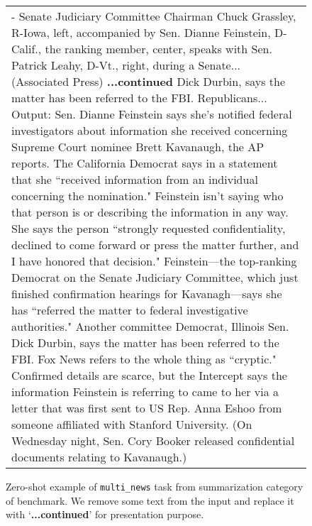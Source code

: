 \begin{figure}[h]
\begin{tabular}{p{}}
\vspace{1pt} \newline \vspace{1pt} \newline \vspace{1pt} \newline -  Senate Judiciary Committee Chairman Chuck Grassley, R-Iowa, left, accompanied by Sen. Dianne Feinstein, D-Calif., the ranking member, center, speaks with Sen. Patrick Leahy, D-Vt., right, during a Senate... (Associated Press) \textbf{...continued}
Dick Durbin, says the matter has been referred to the FBI. \vspace{1pt} \newline  \vspace{1pt} \newline  Republicans...\vspace{1pt} \newline Output: \textcolor{cadmiumgreen}{Sen. Dianne Feinstein says she's notified federal investigators about information she received concerning Supreme Court nominee Brett Kavanaugh, the AP reports. The California Democrat says in a statement that she ``received information from an individual concerning the nomination." Feinstein isn't saying who that person is or describing the information in any way. She says the person ``strongly requested confidentiality, declined to come forward or press the matter further, and I have honored that decision." Feinstein—the top-ranking Democrat on the Senate Judiciary Committee, which just finished confirmation hearings for Kavanagh—says she has ``referred the matter to federal investigative authorities." Another committee Democrat, Illinois Sen. Dick Durbin, says the matter has been referred to the FBI. Fox News refers to the whole thing as ``cryptic." Confirmed details are scarce, but the Intercept says the information Feinstein is referring to came to her via a letter that was first sent to US Rep. Anna Eshoo from someone affiliated with Stanford University. (On Wednesday night, Sen. Cory Booker released confidential documents relating to Kavanaugh.)} \\
\end{tabular}
\caption{Zero-shot example of \texttt{multi\_news} task from summarization category of \promptsource benchmark. We remove some text from the input and replace it with `\textbf{...continued}' for presentation purpose.}
\end{figure}




